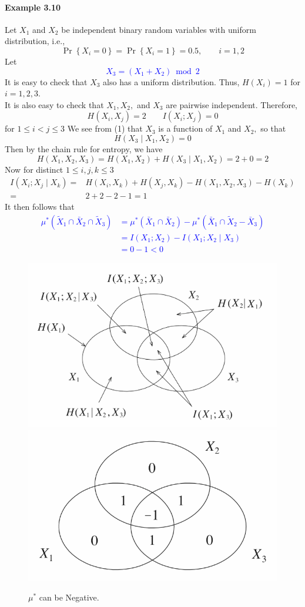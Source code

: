 \documentclass[8pt]{article}
\begin{document}
\paragraph{Example 3.10} 
Let $X_{1}$ and $X_{2}$ be independent binary random variables with uniform distribution, i.e.,
$$
\operatorname{Pr}\left\{X_{i}=0\right\}=\operatorname{Pr}\left\{X_{i}=1\right\}=0.5, \qquad i=1,2
$$
Let
\textcolor{blue}{
$$
X_{3}=\left(X_{1}+X_{2}\right) \bmod 2
$$
}
It is easy to check that $X_{3}$ also has a uniform distribution. Thus,
$H\left(X_{i}\right)=1$ for $i=1,2,3$.\\
It is also easy to check that $X_{1}, X_{2},$ and $X_{3}$ are pairwise independent. Therefore,
$$
H\left(X_{i}, X_{j}\right)=2
\qquad
I\left(X_{i} ; X_{j}\right)=0
$$
for $1 \leq i<j \leq 3$
We see from (1) that $X_{3}$ is a function of $X_{1}$ and $X_{2},$ so that
$$
H\left(X_{3} \mid X_{1}, X_{2}\right)=0
$$
Then by the chain rule for entropy, we have
$$
H\left(X_{1}, X_{2}, X_{3}\right) = H\left(X_{1}, X_{2}\right)+H\left(X_{3} \mid X_{1}, X_{2}\right)
= 2+0 = 2
$$
Now for distinct $1 \leq i, j, k \leq 3$
$$
\begin{aligned}
I\left(X_{i} ; X_{j} \mid X_{k}\right)
=& H\left(X_{i}, X_{k}\right)+H\left(X_{j}, X_{k}\right) -H\left(X_{1}, X_{2}, X_{3}\right)-H\left(X_{k}\right) \\
=&2+2-2-1 = 1
\end{aligned}
$$
It then follows that
\textcolor{blue}{
$$
\begin{aligned}
\mu^{*} \left(\tilde{X}_{1} \cap \bar{X}_{2} \cap \tilde{X}_{3}\right) &=\mu^{*}\left(\bar{X}_{1} \cap \bar{X}_{2}\right)-\mu^{*}\left(\bar{X}_{1} \cap \tilde{X}_{2}-\bar{X}_{3}\right) \\
&= I\left(X_{1} ; X_{2}\right)-I\left(X_{1} ; X_{2} \mid X_{3}\right) \\
&=0-1 <0
\end{aligned}
$$
}
\begin{figure}[!h]
    \centering
    \includegraphics[width=0.33\linewidth]{imgs/exp3_10.png}
    \includegraphics[width=0.3\linewidth]{imgs/exp3_10_2.png}
    \caption{$\mu^{*}$ can be Negative.}
    \label{fig:my_label}
\end{figure}
\end{document}
